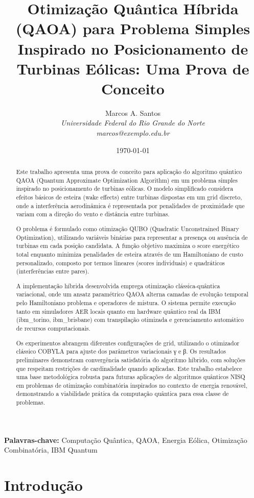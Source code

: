\documentclass[12pt,a4paper]{article}
\title{Otimização Quântica Híbrida (QAOA) para Problema Simples Inspirado no Posicionamento de Turbinas Eólicas: Uma Prova de Conceito}
\author{Marcos A. Santos\\
\textit{Universidade Federal do Rio Grande do Norte}\\
\textit{marcos@exemplo.edu.br}}
\date{\today}
\begin{document}
\maketitle

\begin{abstract}
Este trabalho apresenta uma prova de conceito para aplicação do algoritmo quântico QAOA (Quantum Approximate Optimization Algorithm) em um problema simples inspirado no posicionamento de turbinas eólicas. O modelo simplificado considera efeitos básicos de esteira (wake effects) entre turbinas dispostas em um grid discreto, onde a interferência aerodinâmica é representada por penalidades de proximidade que variam com a direção do vento e distância entre turbinas.

O problema é formulado como otimização QUBO (Quadratic Unconstrained Binary Optimization), utilizando variáveis binárias para representar a presença ou ausência de turbinas em cada posição candidata. A função objetivo maximiza o score energético total enquanto minimiza penalidades de esteira através de um Hamiltoniano de custo personalizado, composto por termos lineares (scores individuais) e quadráticos (interferências entre pares).

A implementação híbrida desenvolvida emprega otimização clássica-quântica variacional, onde um ansatz paramétrico QAOA alterna camadas de evolução temporal pelo Hamiltoniano problema e operadores de mistura. O sistema permite execução tanto em simuladores AER locais quanto em hardware quântico real da IBM (ibm_torino, ibm_brisbane) com transpilação otimizada e gerenciamento automático de recursos computacionais.

Os experimentos abrangem diferentes configurações de grid, utilizando o otimizador clássico COBYLA para ajuste dos parâmetros variacionais γ e β. Os resultados preliminares demonstram convergência satisfatória do algoritmo híbrido, com soluções que respeitam restrições de cardinalidade quando aplicadas. Este trabalho estabelece uma base metodológica robusta para futuras aplicações de algoritmos quânticos NISQ em problemas de otimização combinatória inspirados no contexto de energia renovável, demonstrando a viabilidade prática da computação quântica para essa classe de problemas.
\end{abstract}

\textbf{Palavras-chave:} Computação Quântica, QAOA, Energia Eólica, Otimização Combinatória, IBM Quantum

\section{Introdução}
\end{document}
